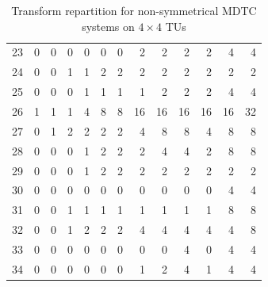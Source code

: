 \documentclass[11pt,a4paper,openright,twoside]{book}
\numberwithin{equation}{section} %
\numberwithin{figure}{section} %
\numberwithin{table}{section} %
\begin{document}
\begin{table}[h]
\begin{tabular}{c|rrrrrrrrrrrr}
		23 & 0 & 0 & 0 & 0  & 0  & 0  & 2  & 2  & 2  & 2  & 4  & 4 \\
		24 & 0 & 0 & 1 & 1  & 2  & 2  & 2  & 2  & 2  & 2  & 2  & 2 \\
		25 & 0 & 0 & 0 & 1  & 1  & 1  & 1  & 2  & 2  & 2  & 4  & 4 \\
		26 & 1 & 1 & 1 & 4  & 8  & 8  & 16 & 16 & 16 & 16 & 16 & 32 \\
		27 & 0 & 1 & 2 & 2  & 2  & 2  & 4  & 8  & 8  & 4  & 8  & 8 \\
		28 & 0 & 0 & 0 & 1  & 2  & 2  & 2  & 4  & 4  & 2  & 8  & 8 \\
		29 & 0 & 0 & 0 & 1  & 2  & 2  & 2  & 2  & 2  & 2  & 2  & 2 \\
		30 & 0 & 0 & 0 & 0  & 0  & 0  & 0  & 0  & 0  & 0  & 4  & 4 \\
		31 & 0 & 0 & 1 & 1  & 1  & 1  & 1  & 1  & 1  & 1  & 8  & 8 \\
		32 & 0 & 0 & 1 & 2  & 2  & 2  & 4  & 4  & 4  & 4  & 4  & 8 \\
		33 & 0 & 0 & 0 & 0  & 0  & 0  & 0  & 0  & 4  & 0  & 4  & 4 \\
		34 & 0 & 0 & 0 & 0  & 0  & 0  & 1  & 2  & 4  & 1  & 4  & 4 \\
	\end{tabular}
	\caption{Transform repartition for non-symmetrical \acs{MDTC} systems on
	$4\times4$ \acsp{TU}}
	\label{tab:config_nonsym_mdtc_4}
\end{table}
\end{document}
